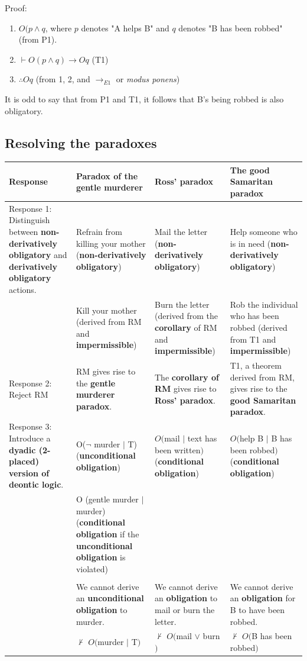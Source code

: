 \documentclass[11pt]{article}
\begin{document}
Proof:
\begin{enumerate}
\item \(O(p \wedge q\), where \(p\) denotes "A helps B" and \(q\) denotes "B has been robbed" (from P1).
\item \(\vdash O(p \wedge q) \rightarrow Oq\) (T1)
\item \(\therefore Oq\) (from 1, 2, and \(\rightarrow_{E1}\) or \emph{modus ponens})
\end{enumerate}

It is odd to say that from P1 and T1, it follows that B's being robbed is also obligatory.
\subsection{Resolving the paradoxes}
\label{sec:org306b822}
\begin{center}
\begin{tabularx}{1.2\textwidth}{|X|X|X|X|}
\hline
Response & Paradox of the gentle murderer & Ross' paradox & The good Samaritan paradox\\
\hline
Response 1: Distinguish between \textbf{non-derivatively obligatory} and \textbf{derivatively obligatory} actions. & Refrain from killing your mother (\textbf{non-derivatively obligatory}) & Mail the letter (\textbf{non-derivatively obligatory}) & Help someone who is in need (\textbf{non-derivatively obligatory})\\
 & Kill your mother (derived from RM and \textbf{impermissible}) & Burn the letter (derived from the \textbf{corollary} of RM and \textbf{impermissible}) & Rob the individual who has been robbed (derived from T1 and \textbf{impermissible})\\
\hline
Response 2: Reject RM & RM gives rise to the \textbf{gentle murderer paradox}. & The \textbf{corollary of RM} gives rise to \textbf{Ross' paradox}. & T1, a theorem derived from RM, gives rise to the \textbf{good Samaritan paradox}.\\
\hline
Response 3: Introduce a \textbf{dyadic (2-placed) version of deontic logic}. & O(\(\neg\) murder \(\vert\) T) (\textbf{unconditional obligation}) & \(O(\)mail \(\vert\) text has been written\()\) (\textbf{conditional obligation}) & \(O(\)help B \(\vert\) B has been robbed\()\) (\textbf{conditional obligation})\\
 & O (gentle murder \(\vert\) murder) (\textbf{conditional obligation} if the \textbf{unconditional obligation} is violated) &  & \\
 &  &  & \\
 & We cannot derive an \textbf{unconditional obligation} to murder. & We cannot derive an \textbf{obligation} to mail or burn the letter. & We cannot derive an \textbf{obligation} for B to have been robbed.\\
 & \(\nvdash\) \(O(\)murder \(\vert\) T\()\) & \(\nvdash\) \(O(\)mail \(\vee\) burn\()\) & \(\nvdash\) \(O(\)B has been robbed\()\)\\
\hline
\end{tabularx}
\end{center}
\end{document}
